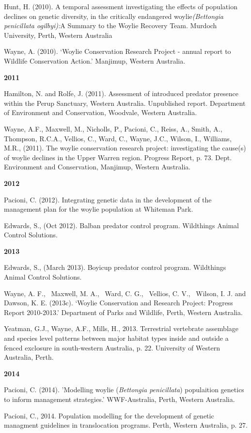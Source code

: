 \documentclass[version=last,
    paper=a4,                               %
    10pt,                                   %
    dvipsnames,
    oneside,                              %
    headings=openany,                       %
    open=any,
    BCOR=7mm,                               %
    DIV=15,     %
]{scrbook}
\begin{document}
Hunt, H. (2010). A temporal assessment investigating the effects of
population declines on genetic diversity, in the critically endangered
woylie\emph{(Bettongia penicillata ogilbyi):}A Summary to the Woylie
Recovery Team. Murdoch University, Perth, Western Australia

Wayne, A. (2010). `Woylie Conservation Research Project - annual report
to Wildlife Conservation Action.' Manjimup, Western Australia.

\textbf{2011}

Hamilton, N. and Rolfe, J. (2011). Assessment of introduced predator
presence within the Perup Sanctuary, Western Australia. Unpublished
report. Department of Environment and Conservation, Woodvale, Western
Australia.

Wayne, A.F., Maxwell, M., Nicholls, P., Pacioni, C., Reiss, A., Smith,
A., Thompson, R.C.A., Vellios, C., Ward, C., Wayne, J.C., Wilson, I.,
Williams, M.R., (2011). The woylie conservation research project:
investigating the cause(s) of woylie declines in the Upper Warren
region. Progress Report, p. 73. Dept. Environment and Conservation,
Manjimup, Western Australia.

\textbf{2012}

Pacioni, C. (2012). Integrating genetic data in the development of the
management plan for the woylie population at Whiteman Park.

Edwards, S., (Oct 2012). Balban predator control program. Wildthings
Animal Control Solutions.

\textbf{2013}

Edwards, S., (March 2013). Boyicup predator control program. Wildthings
Animal Control Solutions.

Wayne, A. F.,~ Maxwell, M. A.,~ Ward, C. G.,~ Vellios, C. V.,~ Wilson,
I. J. and Dawson, K. E. (2013c). `Woylie Conservation and Research
Project: Progress Report 2010-2013.' Department of Parks and Wildlife,
Perth, Western Australia.

Yeatman, G.J., Wayne, A.F., Mills, H., 2013. Terrestrial vertebrate
assemblage and species level patterns between major habitat types inside
and outside a fenced exclosure in south-western Australia, p. 22.
University of Western Australia, Perth.

\textbf{2014}

Pacioni, C. (2014). 'Modelling woylie (\emph{Bettongia penicillata})
populaition genetics to inform management strategies.' WWF-Australia,
Perth, Western Australia.

Pacioni, C., 2014. Population modelling for the development of genetic
managment guidelines in translocation programs. Perth, Western
Australia, p. 27.
\end{document}
